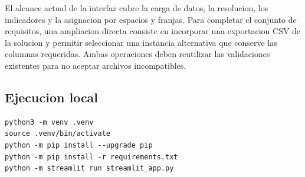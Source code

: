 El alcance actual de la interfaz cubre la carga de datos, la resolucion, los
indicadores y la asignacion por espacios y franjas. Para completar el conjunto
de requisitos, una ampliacion directa consiste en incorporar una exportacion
CSV de la solucion y permitir seleccionar una instancia alternativa que conserve
las columnas requeridas. Ambas operaciones deben reutilizar las validaciones
existentes para no aceptar archivos incompatibles.

\subsection{Ejecucion local}

\begin{verbatim}
python3 -m venv .venv
source .venv/bin/activate
python -m pip install --upgrade pip
python -m pip install -r requirements.txt
python -m streamlit run streamlit_app.py
\end{verbatim}
